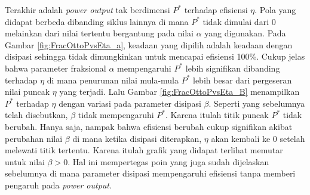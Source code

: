 Terakhir adalah \textit{power output} tak berdimensi \(P^*\) terhadap efisiensi \(\eta\). Pola yang didapat berbeda dibanding siklus lainnya di mana \(P^*\) tidak dimulai dari 0 melainkan dari nilai tertentu bergantung pada nilai \(\alpha\) yang digunakan. Pada Gambar \ref{fig:FracOttoPvsEta_a}, keadaan yang dipilih adalah keadaan dengan disipasi sehingga tidak dimungkinkan untuk mencapai efisiensi 100\%. Cukup jelas bahwa parameter fraksional \(\alpha\) mempengaruhi \(P^*\) lebih signifikan dibanding terhadap \(\eta\) di mana penurunan nilai mula-mula \(P^*\) lebih besar dari pergeseran nilai puncak \(\eta\) yang terjadi. Lalu Gambar \ref{fig:FracOttoPvsEta_B} menampilkan \(P^*\) terhadap \(\eta\) dengan variasi pada parameter disipasi \(\beta\). Seperti yang sebelumnya telah disebutkan, \(\beta\) tidak mempengaruhi \(P^*\). Karena itulah titik puncak \(P^*\) tidak berubah. Hanya saja, nampak bahwa efisiensi berubah cukup signifikan akibat perubahan nilai \(\beta\) di mana ketika disipasi diterapkan, \(\eta\) akan kembali ke 0 setelah melewati titik tertentu. Karena itulah grafik yang didapat terlihat memutar untuk nilai \(\beta>0\). Hal ini mempertegas poin yang juga sudah dijelaskan sebelumnya di mana parameter disipasi mempengaruhi efisiensi tanpa memberi pengaruh pada \textit{power output}.

